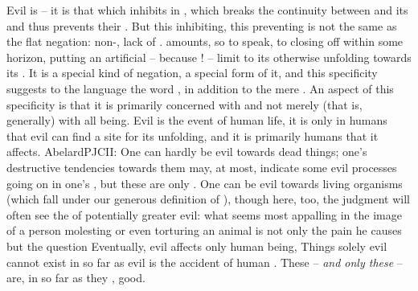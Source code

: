 \pa\label{alienX} Evil is  -- it is that which inhibits
 in , which breaks the continuity between
 and its  and thus prevents their .
But this inhibiting, this preventing is not the same as the flat negation:
non-, lack of .  amounts, so to
speak, to closing off  within some horizon, putting an artificial
-- because ! -- limit to its otherwise  unfolding
towards its . It is a special kind of negation, a special form of it,
and this specificity suggests to the language the word , in addition to
the mere .  An aspect of this specificity is that it is primarily
concerned with  and not merely (that is, generally) with all
being.  Evil is the event of human life, it is only in humans that evil can find
a site for its unfolding, and it is primarily humans that it affects.
\citet{Indeed, our vices or sins, which are what are properly to be called
  evils, are unable to exist except in souls -- that is, in good
  creatures.}{AbelardPJC}{II:} One can hardly be evil towards dead things; one's
destructive tendencies towards them may, at most, indicate some evil processes
going on in one's , but these are only . One can be evil towards
living organisms (which fall under our generous definition of ),
though here, too, the judgment will often see the  of potentially
greater evil: what seems most appalling in the image of a person molesting or
even torturing an animal is not only the pain he causes but the question
  Eventually,
evil affects only human being,  Things solely evil cannot exist in so far as evil is the accident of
human . These -- {\em and only these} -- are, in
so far as they , good.


